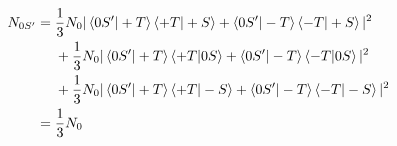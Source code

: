 \documentclass[utf8]{ctexart}
\begin{document}
\begin{align}
	N_{0S'}={}&\frac{1}{3}N_0|\braket{0S'|+T}\braket{+T|+S}+\braket{0S'|-T}\braket{-T|+S}|^2\notag\\
	&+\frac{1}{3}N_0|\braket{0S'|+T}\braket{+T|0S}+\braket{0S'|-T}\braket{-T|0S}|^2\notag\\
	&+\frac{1}{3}N_0|\braket{0S'|+T}\braket{+T|-S}+\braket{0S'|-T}\braket{-T|-S}|^2\notag\\
	={}&\frac{1}{3}N_0\notag
\end{align}
\end{document}
